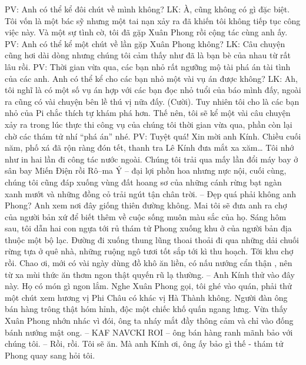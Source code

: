 	\vskip 0.1cm
	PV: Anh có thể kể đôi chút về mình không?
	\vskip 0.1cm
	LK: À, cũng không có gì đặc biệt. Tôi vốn là một bác sỹ nhưng một tai nạn xảy ra đã khiến tôi không tiếp tục công việc này. Và một sự tình cờ, tôi đã gặp Xuân Phong rồi  cộng tác cùng anh ấy. 
	\vskip 0.1cm
	PV: Anh có thể kể một chút về lần gặp Xuân Phong không?
	\vskip 0.1cm
	LK: Câu chuyện cũng hơi dài dòng nhưng chúng tôi cảm thấy như đã là bạn bè của nhau từ rất lâu rồi.
	\vskip 0.1cm
	PV: Thời gian vừa qua,  các bạn nhỏ rất ngưỡng mộ tài phá án tài tình của các anh. Anh có thể kể cho các bạn nhỏ một vài vụ án được không?
	\vskip 0.1cm
	LK: Ah, tôi  nghĩ là có một số vụ án hợp với các bạn đọc nhỏ tuổi của báo mình đấy, ngoài ra cũng có  vài chuyện bên lề  thú vị nữa đấy. (Cười). Tuy nhiên tôi cho là các bạn nhỏ của Pi chắc thích tự khám phá hơn. Thế nên, tôi sẽ kể một vài câu chuyện xảy ra trong lúc thực thi công vụ của chúng tôi thời gian vừa qua, phần còn lại chờ các thám tử nhí “phá án” nhé.
	\vskip 0.1cm
	PV: Tuyệt quá! Xin mời anh Kính.
	\vskip 0.1cm
	Chiều cuối năm, phố xá đã rộn ràng đón tết, thanh tra Lê Kính đưa mắt xa xăm…
	Tôi nhớ như in hai lần đi công tác nước ngoài.
	\vskip 0.1cm
	\newpage
	\textbf{\color{toancuabi}{Thổ ngữ châu Phi} } %
	\vskip 0.1cm 
	Chúng tôi trải qua mấy lần đổi máy bay ở sân bay Miến Điện rồi Rô--ma Ý -- đại lợi phồn hoa nhưng nực nội, cuối cùng, chúng tôi cũng đáp xuống vùng đất hoang sơ của những cánh rừng bạt ngàn xanh mướt và những đồng cỏ trải ngút tận chân trời. 
	\vskip 0.1cm
	-- Đẹp quá phải không anh Phong? Anh xem nơi đây giống thiên đường không. Mai tôi sẽ đưa anh ra chợ của người bản xứ để biết thêm về cuộc sống muôn màu sắc của họ. 
	\vskip 0.1cm
	Sáng hôm sau, tôi dẫn hai con ngựa tới rủ thám tử Phong xuống khu ở của người bản địa thuộc một bộ lạc. Đường đi xuống thung lũng thoai thoải đi qua những dải chuối rừng tựa ở quê nhà, những ruộng ngô tươi tốt sắp tới kì thu hoạch. Tới khu chợ rồi. Chao ơi, mới có vài ngày dùng đồ khô ăn liền, có nấu nướng cẩn thận , nên từ xa mùi thức ăn thơm ngon thật quyến rũ lạ thường.
	\vskip 0.1cm
	-- Anh Kính thử vào đây này. Họ có món gì ngon lắm.
		\vskip 0.1cm
Nghe Xuân Phong gọi, tôi ghé vào quán, phải thử một chút xem hương vị Phi Châu có khác vị Hà Thành không.
	\vskip 0.1cm
	Người đàn ông bán hàng trông thật hóm hỉnh, độc một chiếc khố quấn ngang lưng. Vừa thấy Xuân Phong nhớn nhác vì đói, ông ta nháy mắt đầy thông cảm và chỉ vào đống bánh nướng mật ong.
	\vskip 0.1cm
	-- KAF NAVCKI ROI -- ông bán hàng ranh mãnh bảo với chúng tôi.
	\vskip 0.1cm
	-- Rồi, rồi. Tôi sẽ ăn. Mà anh Kính ơi, ông ấy bảo gì thế - thám tử Phong quay sang hỏi tôi.
